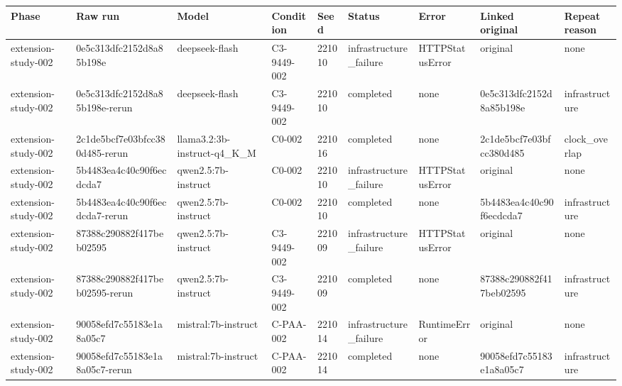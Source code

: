 \begin{tabular}{lllllllll}
\hline
Phase & Raw run & Model & Condition & Seed & Status & Error & Linked original & Repeat reason \\
\hline
extension-study-002 & 0e5c313dfc2152d8a85b198e & deepseek-flash & C3-9449-002 & 221010 & infrastructure\_failure & HTTPStatusError & original & none \\
extension-study-002 & 0e5c313dfc2152d8a85b198e-rerun & deepseek-flash & C3-9449-002 & 221010 & completed & none & 0e5c313dfc2152d8a85b198e & infrastructure \\
extension-study-002 & 2c1de5bcf7e03bfcc380d485-rerun & llama3.2:3b-instruct-q4\_K\_M & C0-002 & 221016 & completed & none & 2c1de5bcf7e03bfcc380d485 & clock\_overlap \\
extension-study-002 & 5b4483ea4c40c90f6ecdcda7 & qwen2.5:7b-instruct & C0-002 & 221010 & infrastructure\_failure & HTTPStatusError & original & none \\
extension-study-002 & 5b4483ea4c40c90f6ecdcda7-rerun & qwen2.5:7b-instruct & C0-002 & 221010 & completed & none & 5b4483ea4c40c90f6ecdcda7 & infrastructure \\
extension-study-002 & 87388c290882f417beb02595 & qwen2.5:7b-instruct & C3-9449-002 & 221009 & infrastructure\_failure & HTTPStatusError & original & none \\
extension-study-002 & 87388c290882f417beb02595-rerun & qwen2.5:7b-instruct & C3-9449-002 & 221009 & completed & none & 87388c290882f417beb02595 & infrastructure \\
extension-study-002 & 90058efd7c55183e1a8a05c7 & mistral:7b-instruct & C-PAA-002 & 221014 & infrastructure\_failure & RuntimeError & original & none \\
extension-study-002 & 90058efd7c55183e1a8a05c7-rerun & mistral:7b-instruct & C-PAA-002 & 221014 & completed & none & 90058efd7c55183e1a8a05c7 & infrastructure \\
\hline
\end{tabular}
